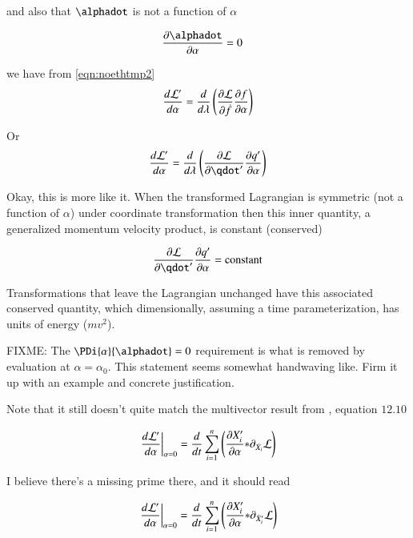 \documentclass{article}
\newcommand{\DD}[2]{\frac{d{#2}}{d{#1}}}
\newcommand{\Xdot}[0]{\dot{X}}
\begin{document}
and also that $\alphadot$ is not a function of $\alpha$

\begin{align*}
\PD{\alpha}{\alphadot} &= 0
\end{align*}

we have from \ref{eqn:noethtmp2}
\begin{align*}
\DD{\alpha}{\LL'}
&= \frac{d}{d\lambda} \left( \PD{\fdot}{\LL} \PD{\alpha}{f} \right) \\
\end{align*}

Or
\begin{align}
\DD{\alpha}{\LL'}
&= \frac{d}{d\lambda} \left( \PD{\qdot'}{\LL} \PD{\alpha}{q'} \right) \\
\end{align}

Okay, this is more like it.  When the transformed Lagrangian is symmetric (not a function of $\alpha$) under coordinate transformation then this
inner quantity, a generalized momentum velocity product, is constant (conserved)

\begin{align*}
\PD{\qdot'}{\LL} \PD{\alpha}{q'} = \text{constant}
\end{align*}

Transformations that leave the Lagrangian unchanged have this associated conserved quantity, which dimensionally, assuming a time parameterization, has units of
energy ($mv^2$).

FIXME: The $\PDi{\alpha}{\alphadot} = 0$ requirement is what is removed by evaluation at $\alpha = \alpha_0$.  This statement seems somewhat handwaving like.  Firm it up with an example and concrete justification.

Note that it still doesn't quite match the multivector result from
\cite{doran2003gap}, equation $12.10$

\begin{align*}
\left.\DD{\alpha}{\LL'}\right\vert_{\alpha=0}
&= \frac{d}{dt} \sum_{i=1}^n \left( 
\PD{\alpha}{X_i'} \conj \partial_{\Xdot_i}{\LL}
\right) \\
\end{align*}

I believe there's a missing prime there, and it should read

\begin{align*}
\left.\DD{\alpha}{\LL'}\right\vert_{\alpha=0}
&= \frac{d}{dt} \sum_{i=1}^n \left( 
\PD{\alpha}{X_i'} \conj \partial_{\Xdot_i'}{\LL}
\right) \\
\end{align*}
\end{document}
